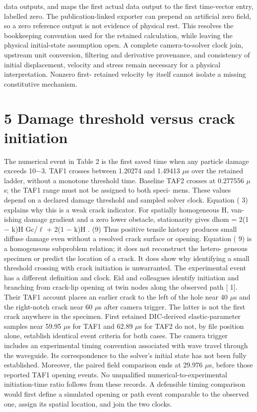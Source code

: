 \documentclass[11pt]{article}
\begin{document}
data outputs, and maps the first actual data output to the first time-vector entry, labelled zero.
The publication-linked exporter can prepend an artificial zero field, so a zero reference output
is not evidence of physical rest. This resolves the bookkeeping convention used for the retained
calculation, while leaving the physical initial-state assumption open. A complete camera-to-solver
clock join, upstream unit conversion, filtering and derivative provenance, and consistency of initial
displacement, velocity and stress remain necessary for a physical interpretation. Nonzero first-
retained velocity by itself cannot isolate a missing constitutive mechanism.

\section*{5 Damage threshold versus crack initiation}

The numerical event in Table 2 is the first saved time when any particle damage exceeds 10\ensuremath{-}3. TAF1
crosses between 1.20274 and 1.49413 \ensuremath{\mu}s over the retained ladder, without a monotone threshold
time. Baseline TAF2 crosses at 0.277556 \ensuremath{\mu}s; the TAF1 range must not be assigned to both speci-
mens. These values depend on a declared damage threshold and sampled solver clock.
Equation ( 3) explains why this is a weak crack indicator. For spatially homogeneous H, van-
ishing damage gradient and a zero lower obstacle, stationarity gives
dhom = 2(1 \ensuremath{-} k)H
Gc/\ensuremath{\ell} + 2(1 \ensuremath{-} k)H . (9)
Thus positive tensile history produces small diffuse damage even without a resolved crack surface
or opening. Equation ( 9) is a homogeneous subproblem relation; it does not reconstruct the hetero-
geneous specimen or predict the location of a crack. It does show why identifying a small threshold
crossing with crack initiation is unwarranted.
The experimental event has a different definition and clock. Eid and colleagues identify initiation
and branching from crack-lip opening at twin nodes along the observed path [ 1]. Their TAF1
account places an earlier crack to the left of the hole near 40 \ensuremath{\mu}s and the right-notch crack near
60 \ensuremath{\mu}s after camera trigger. The latter is not the first crack anywhere in the specimen. First
retained DIC-derived elastic-parameter samples near 59.95 \ensuremath{\mu}s for TAF1 and 62.89 \ensuremath{\mu}s for TAF2 do
not, by file position alone, establish identical event criteria for both cases.
The camera trigger includes an experimental timing convention associated with wave travel
through the waveguide. Its correspondence to the solver’s initial state has not been fully established.
Moreover, the paired field comparison ends at 29.976 \ensuremath{\mu}s, before those reported TAF1 opening
events. No unqualified numerical-to-experimental initiation-time ratio follows from these records.
A defensible timing comparison would first define a simulated opening or path event comparable
to the observed one, assign its spatial location, and join the two clocks.
\end{document}
